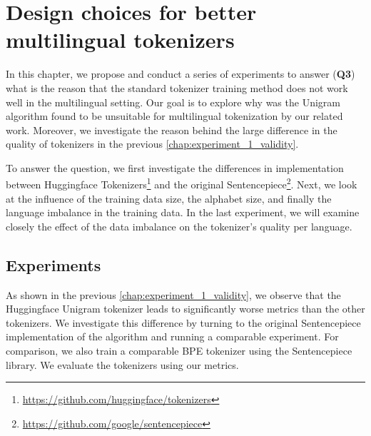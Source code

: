 \chapter{Design choices for better multilingual tokenizers}
\label{chap:experiment_2_properties}


In this chapter, we propose and conduct a series of experiments to answer (\textbf{Q3}) what is the reason that the standard tokenizer training method does not work well in the multilingual setting.
Our goal is to explore why was the Unigram algorithm found to be unsuitable for multilingual tokenization by our related work. Moreover, we investigate the reason behind the large difference in the quality of tokenizers in the previous \autoref{chap:experiment_1_validity}.

To answer the question, we first investigate the differences in implementation between Huggingface Tokenizers\footnote{\href{https://github.com/huggingface/tokenizers}{https://github.com/huggingface/tokenizers}} and the original Sentencepiece\footnote{\href{https://github.com/google/sentencepiece}{https://github.com/google/sentencepiece}}. Next, we look at the influence of the training data size, the alphabet size, and finally the language imbalance in the training data. In the last experiment, we will examine closely the effect of the data imbalance on the tokenizer's quality per language.

\section{Experiments}

As shown in the previous \autoref{chap:experiment_1_validity}, we observe that the Huggingface Unigram tokenizer leads to significantly worse metrics than the other tokenizers.
 We investigate this difference by turning to the original Sentencepiece implementation of the algorithm and running a comparable experiment.
 For comparison, we also train a comparable BPE tokenizer using the Sentencepiece library. We evaluate the tokenizers using our metrics.


